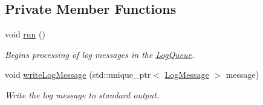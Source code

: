 \subsection*{Private Member Functions}
\begin{DoxyCompactItemize}
\item 
void \hyperlink{class_aws_1_1_iot_1_1_device_client_1_1_logging_1_1_std_out_logger_a8b7972522f4c1e399f9f8448da5703f5}{run} ()
\begin{DoxyCompactList}\small\item\em Begins processing of log messages in the \hyperlink{class_aws_1_1_iot_1_1_device_client_1_1_logging_1_1_log_queue}{Log\+Queue}. \end{DoxyCompactList}\item 
void \hyperlink{class_aws_1_1_iot_1_1_device_client_1_1_logging_1_1_std_out_logger_a795accad8a751b0f94341bb1b3325121}{write\+Log\+Message} (std\+::unique\+\_\+ptr$<$ \hyperlink{class_aws_1_1_iot_1_1_device_client_1_1_logging_1_1_log_message}{Log\+Message} $>$ message)
\begin{DoxyCompactList}\small\item\em Write the log message to standard output. \end{DoxyCompactList}\end{DoxyCompactItemize}
